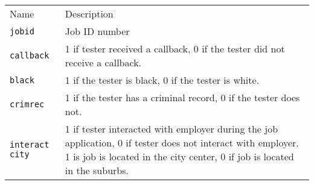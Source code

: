 \documentclass[]{article}
\begin{document}
\begin{longtable}[c]{@{}ll@{}}
\toprule\addlinespace
\begin{minipage}[b]{0.29\columnwidth}\raggedright
Name
\end{minipage} & \begin{minipage}[b]{0.65\columnwidth}\raggedright
Description
\end{minipage}
\\\addlinespace
\midrule\endhead
\begin{minipage}[t]{0.29\columnwidth}\raggedright
\texttt{jobid}
\end{minipage} & \begin{minipage}[t]{0.65\columnwidth}\raggedright
Job ID number
\end{minipage}
\\\addlinespace
\begin{minipage}[t]{0.29\columnwidth}\raggedright
\texttt{callback}
\end{minipage} & \begin{minipage}[t]{0.65\columnwidth}\raggedright
1 if tester received a callback, 0 if the tester did not receive a
callback.
\end{minipage}
\\\addlinespace
\begin{minipage}[t]{0.29\columnwidth}\raggedright
\texttt{black}
\end{minipage} & \begin{minipage}[t]{0.65\columnwidth}\raggedright
1 if the tester is black, 0 if the tester is white.
\end{minipage}
\\\addlinespace
\begin{minipage}[t]{0.29\columnwidth}\raggedright
\texttt{crimrec}
\end{minipage} & \begin{minipage}[t]{0.65\columnwidth}\raggedright
1 if the tester has a criminal record, 0 if the tester does not.
\end{minipage}
\\\addlinespace
\begin{minipage}[t]{0.29\columnwidth}\raggedright
\texttt{interact} \texttt{city}
\end{minipage} & \begin{minipage}[t]{0.65\columnwidth}\raggedright
1 if tester interacted with employer during the job application, 0 if
tester does not interact with employer. 1 is job is located in the city
center, 0 if job is located in the suburbs.
\end{minipage}

\end{longtable}
\end{document}
